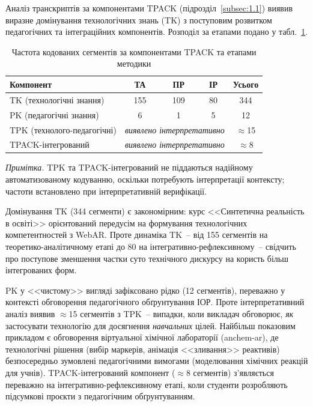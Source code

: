 Аналіз транскриптів за компонентами TPACK (підрозділ~\ref{subsec:1.1}) виявив виразне домінування технологічних знань (TK) з поступовим розвитком педагогічних та інтеграційних компонентів. Розподіл за етапами подано у табл.~\ref{tab:tpack_stages}.

\begin{table}[!h]
\centering
\caption{Частота кодованих сегментів за компонентами TPACK та етапами методики}
\label{tab:tpack_stages}
\small
\begin{tabular}{|l|c|c|c|c|}
\hline
\hfill \textbf{Компонент} & \textbf{ТА} & \textbf{ПР} & \textbf{ІР} & \textbf{Усього} \\
\hline
TK (технологічні знання) & 155 & 109 & 80 & 344 \\
\hline
PK (педагогічні знання) & 6 & 1 & 5 & 12 \\
\hline
TPK (технолого-педагогічні) & \multicolumn{3}{c|}{\textit{виявлено інтерпретативно}} & $\approx$15 \\
\hline
TPACK-інтегрований & \multicolumn{3}{c|}{\textit{виявлено інтерпретативно}} & $\approx$8 \\
\hline
\end{tabular}

\medskip
\footnotesize
\textit{Примітка.} TPK та TPACK-інтегрований не піддаються надійному автоматизованому кодуванню, оскільки потребують інтерпретації контексту; частоти встановлено при інтерпретативній верифікації.
\end{table}

Домінування TK (344 сегменти) є закономірним: курс <<Синтетична реальність в освіті>> орієнтований передусім на формування технологічних компетентностей з WebAR. Проте динаміка TK~-- від 155 сегментів на теоретико-аналітичному етапі до 80 на інтегративно-рефлексивному~-- свідчить про поступове зменшення частки суто технічного дискурсу на користь більш інтегрованих форм.

PK у <<чистому>> вигляді зафіксовано рідко (12 сегментів), переважно у контексті обговорення педагогічного обґрунтування ІОР. Проте інтерпретативний аналіз виявив $\approx$15 сегментів з TPK~-- випадки, коли викладач обговорює, \textit{як} застосувати технологію для досягнення \textit{навчальних} цілей. Найбільш показовим прикладом є обговорення віртуальної хімічної лабораторії (anchem-ar), де технологічні рішення (вибір маркерів, анімація <<зливання>> реактивів) безпосередньо зумовлені педагогічними вимогами (моделювання хімічних реакцій для учнів). TPACK-інтегрований компонент ($\approx$8 сегментів) з'являється переважно на інтегративно-рефлексивному етапі, коли студенти розробляють підсумкові проєкти з педагогічним обґрунтуванням.

